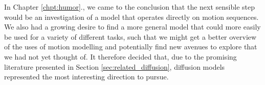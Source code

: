 
In Chapter \ref{chpt:humor}., we came to the conclusion that the next sensible step would be an investigation of a model that operates directly on motion sequences. We also had a growing desire to find a more general model that could more easily be used for a variety of different tasks, such that we might get a better overview of the uses of motion modelling and potentially find new avenues to explore that we had not yet thought of. It therefore decided that, due to the promising literature presented in Section \ref{sec:related_diffusion}, diffusion models represented the most interesting direction to pursue.
